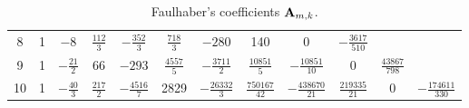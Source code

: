 \begin{table}[H]
\begin{center}
\begin{tabular}{c|ccccccccccc}
            8     & 1 & $-8$            & $\frac{112}{3}$  & $-\frac{352}{3}$  & $\frac{718}{3}$  & $-280$             & 140                 & 0                    & $-\frac{3617}{510}$ &     &     \\
            9     & 1 & $-\frac{21}{2}$ & 66               & $-293$            & $\frac{4557}{5}$ & $-\frac{3711}{2}$  & $\frac{10851}{5}$ & $-\frac{10851}{10}$ & 0 & $\frac{43867}{798}$ &     \\
            10    & 1 & $-\frac{40}{3}$ & $\frac{217}{2}$  & $-\frac{4516}{7}$ & 2829             & $-\frac{26332}{3}$ & $\frac{750167}{42}$ & $-\frac{438670}{21}$ & $\frac{219335}{21}$ & 0 & $-\frac{174611}{330}$ \\
        \end{tabular}
    \end{center}
    \caption{Faulhaber's coefficients ${\mathbf{A}} \sb{m,k}$.}
    \label{tab:table_of_coefficients_a_rational}
\end{table}
